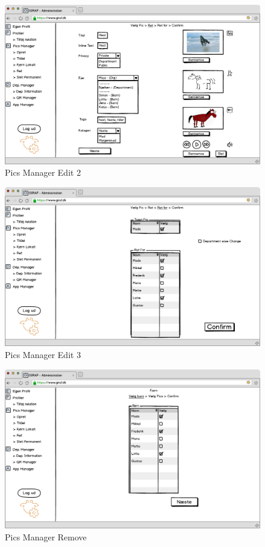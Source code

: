 \newpage

\begin{figure}[p]
\centering
\includegraphics[width=14cm]{images/mockup/picsManagerEdit2.png}
\caption{Pics Manager Edit 2}
\label{fig:pics_manager_edit2}
\end{figure}

\FloatBarrier

\begin{figure}[p]
\centering
\includegraphics[width=14cm]{images/mockup/picsManagerEdit3.png}
\caption{Pics Manager Edit 3}
\label{fig:pics_manager_edit3}
\end{figure}

\newpage

\begin{figure}[p]
\centering
\includegraphics[width=14cm]{images/mockup/picsManagerFjern.png}
\caption{Pics Manager Remove}
\label{fig:pics_manager_remove}
\end{figure}

